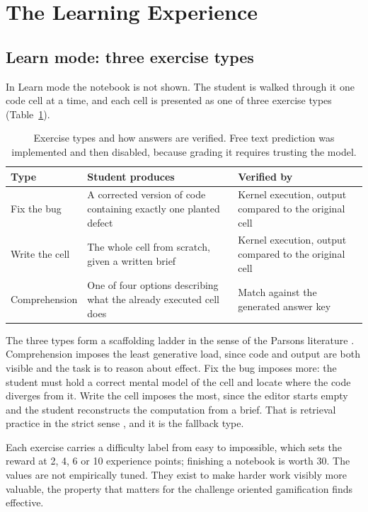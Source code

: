 \documentclass[manuscript]{acmart}
\begin{document}
\section{The Learning Experience}
\label{sec:learn}

\subsection{Learn mode: three exercise types}

In Learn mode the notebook is not shown. The student is walked through it one
code cell at a time, and each cell is presented as one of three exercise types
(Table~\ref{tab:types}).

\begin{table}[t]
\caption{Exercise types and how answers are verified. Free text prediction was
implemented and then disabled, because grading it requires trusting the model.}
\label{tab:types}
\centering\small
\begin{tabular}{@{}p{26mm}p{56mm}p{56mm}@{}}
\toprule
\textbf{Type} & \textbf{Student produces} & \textbf{Verified by} \\
\midrule
Fix the bug & A corrected version of code containing exactly one planted
defect & Kernel execution, output compared to the original cell \\
\addlinespace
Write the cell & The whole cell from scratch, given a written brief & Kernel
execution, output compared to the original cell \\
\addlinespace
Comprehension & One of four options describing what the already executed cell
does & Match against the generated answer key \\
\bottomrule
\end{tabular}
\end{table}

The three types form a scaffolding ladder in the sense of the Parsons
literature \cite{ericson2022parsons}. Comprehension imposes the least
generative load, since code and output are both visible and the task is to
reason about effect. Fix the bug imposes more: the student must hold a correct
mental model of the cell and locate where the code diverges from it. Write the
cell imposes the most, since the editor starts empty and the student
reconstructs the computation from a brief. That is retrieval practice in the
strict sense \cite{roediger2006power}, and it is the fallback type.

Each exercise carries a difficulty label from easy to impossible, which sets
the reward at 2, 4, 6 or 10 experience points; finishing a notebook is worth
30. The values are not empirically tuned. They exist to make harder work
visibly more valuable, the property that matters for the challenge oriented
gamification \cite{sailer2020gamification} finds effective.
\end{document}
